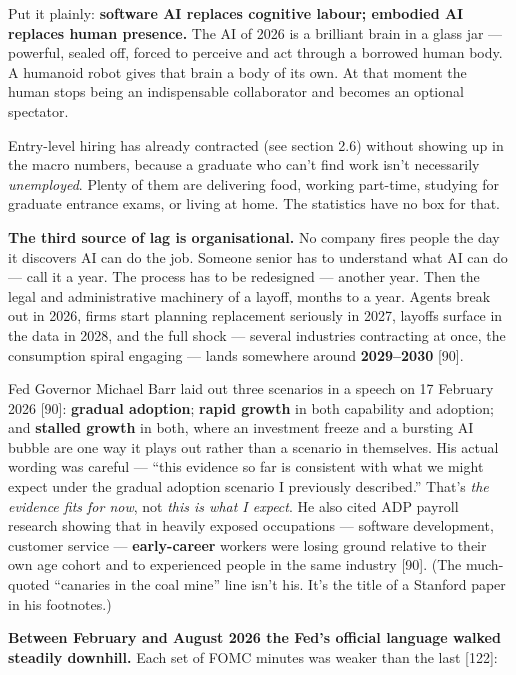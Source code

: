 \documentclass[11pt,a4paper]{article}
\begin{document}
Put it plainly: \textbf{software AI replaces cognitive labour; embodied AI replaces human presence.} The AI of 2026 is a brilliant brain in a glass jar --- powerful, sealed off, forced to perceive and act through a borrowed human body. A humanoid robot gives that brain a body of its own. At that moment the human stops being an indispensable collaborator and becomes an optional spectator.

Entry-level hiring has already contracted (see section 2.6) without showing up in the macro numbers, because a graduate who can't find work isn't necessarily \textit{unemployed}. Plenty of them are delivering food, working part-time, studying for graduate entrance exams, or living at home. The statistics have no box for that.

\textbf{The third source of lag is organisational.} No company fires people the day it discovers AI can do the job. Someone senior has to understand what AI can do --- call it a year. The process has to be redesigned --- another year. Then the legal and administrative machinery of a layoff, months to a year. Agents break out in 2026, firms start planning replacement seriously in 2027, layoffs surface in the data in 2028, and the full shock --- several industries contracting at once, the consumption spiral engaging --- lands somewhere around \textbf{2029--2030}{} [90].

Fed Governor Michael Barr laid out three scenarios in a speech on 17 February 2026 [90]: \textbf{gradual adoption}; \textbf{rapid growth} in both capability and adoption; and \textbf{stalled growth} in both, where an investment freeze and a bursting AI bubble are one way it plays out rather than a scenario in themselves. His actual wording was careful --- ``this evidence so far is consistent with what we might expect under the gradual adoption scenario I previously described.'' That's \textit{the evidence fits for now}, not \textit{this is what I expect}. He also cited ADP payroll research showing that in heavily exposed occupations --- software development, customer service --- \textbf{early-career} workers were losing ground relative to their own age cohort and to experienced people in the same industry [90]. (The much-quoted ``canaries in the coal mine'' line isn't his. It's the title of a Stanford paper in his footnotes.)

\textbf{Between February and August 2026 the Fed's official language walked steadily downhill.} Each set of FOMC minutes was weaker than the last [122]:
\end{document}
